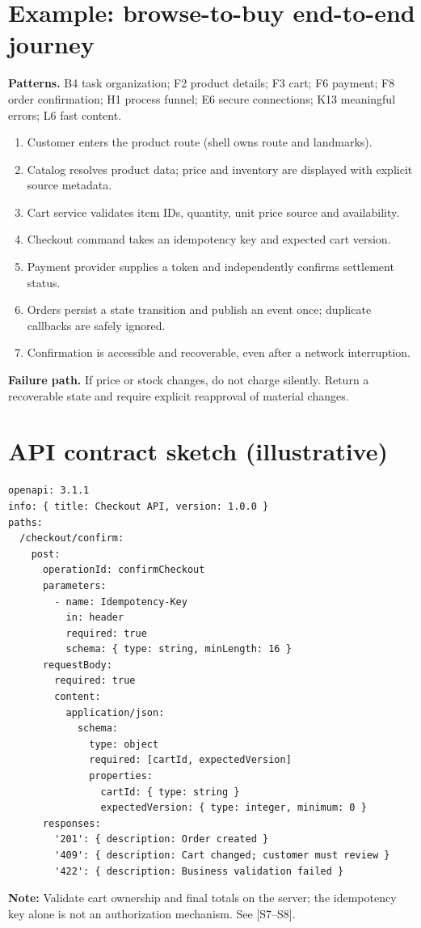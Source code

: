 \documentclass[11pt]{article}
\begin{document}
\section{Example: browse-to-buy end-to-end journey}

\textbf{Patterns.} B4 task organization; F2 product details; F3 cart; F6 payment; F8 order confirmation; H1 process funnel; E6 secure connections; K13 meaningful errors; L6 fast content.
\begin{enumerate}
\item Customer enters the product route (shell owns route and landmarks).
\item Catalog resolves product data; price and inventory are displayed with explicit source metadata.
\item Cart service validates item IDs, quantity, unit price source and availability.
\item Checkout command takes an idempotency key and expected cart version.
\item Payment provider supplies a token and independently confirms settlement status.
\item Orders persist a state transition and publish an event once; duplicate callbacks are safely ignored.
\item Confirmation is accessible and recoverable, even after a network interruption.
\end{enumerate}
\textbf{Failure path.} If price or stock changes, do not charge silently. Return a recoverable state and require explicit reapproval of material changes.

\section{API contract sketch (illustrative)}

\begin{lstlisting}[language={},caption={OpenAPI fragment -- add security schemes and full error schemas for production}]
openapi: 3.1.1
info: { title: Checkout API, version: 1.0.0 }
paths:
  /checkout/confirm:
    post:
      operationId: confirmCheckout
      parameters:
        - name: Idempotency-Key
          in: header
          required: true
          schema: { type: string, minLength: 16 }
      requestBody:
        required: true
        content:
          application/json:
            schema:
              type: object
              required: [cartId, expectedVersion]
              properties:
                cartId: { type: string }
                expectedVersion: { type: integer, minimum: 0 }
      responses:
        '201': { description: Order created }
        '409': { description: Cart changed; customer must review }
        '422': { description: Business validation failed }
\end{lstlisting}
\textbf{Note:} Validate cart ownership and final totals on the server; the idempotency key alone is not an authorization mechanism. See [S7--S8].
\end{document}
